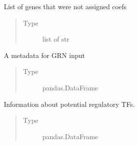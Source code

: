\documentclass[letterpaper,10pt,english]{sphinxmanual}
\begin{document}
\begin{fulllineitems}
\begin{fulllineitems}
\end{fulllineitems}


\begin{fulllineitems}
\label{\detokenize{modules/celloracle:celloracle.Net.failed_genes}}
List of genes that were not assigned coefs
\begin{quote}\begin{description}
\item[{Type}] \leavevmode
list of str

\end{description}\end{quote}

\end{fulllineitems}


\begin{fulllineitems}
\label{\detokenize{modules/celloracle:celloracle.Net.cellstate}}
A metadata for GRN input
\begin{quote}\begin{description}
\item[{Type}] \leavevmode
pandas.DataFrame

\end{description}\end{quote}

\end{fulllineitems}


\begin{fulllineitems}
\label{\detokenize{modules/celloracle:celloracle.Net.TFinfo}}
Information about potential regulatory TFs.
\begin{quote}\begin{description}
\item[{Type}] \leavevmode
pandas.DataFrame

\end{description}\end{quote}

\end{fulllineitems}


\end{fulllineitems}
\end{document}
